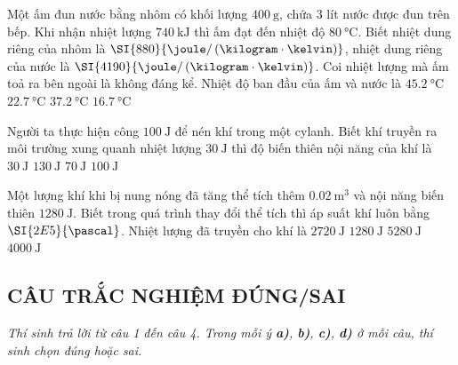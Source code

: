 \begin{ex}
	Một ấm đun nước bằng nhôm có khối lượng $\SI{400}{\gram}$, chứa 3 lít nước được đun trên bếp. Khi nhận nhiệt lượng $\SI{740}{\kilo\joule}$ thì ấm đạt đến nhiệt độ $\SI{80}{\celsius}$. Biết nhiệt dung riêng của nhôm là $\SI{880}{\joule/\left(\kilogram\cdot\kelvin\right)}$, nhiệt dung riêng của nước là $\SI{4190}{\joule/\left(\kilogram\cdot\kelvin\right)}$. Coi nhiệt lượng mà ấm toả ra bên ngoài là không đáng kể. Nhiệt độ ban đầu của ấm và nước là
	\choice
	{$\SI{45.2}{\celsius}$}
	{\True $\SI{22.7}{\celsius}$}
	{$\SI{37.2}{\celsius}$}
	{$\SI{16.7}{\celsius}$}
\end{ex}
\begin{ex}
	Người ta thực hiện công $\SI{100}{\joule}$ để nén khí trong một cylanh. Biết khí truyền ra môi trường xung quanh nhiệt lượng $\SI{30}{\joule}$ thì độ biến thiên nội năng của khí là
	\choice
	{$\SI{30}{\joule}$}
	{$\SI{130}{\joule}$}
	{\True $\SI{70}{\joule}$}
	{$\SI{100}{\joule}$}
\end{ex}
\begin{ex}
	Một lượng khí khi bị nung nóng đã tăng thể tích thêm $\SI{0.02}{\meter^3}$ và nội năng biến thiên $\SI{1280}{\joule}$. Biết trong quá trình thay đổi thể tích thì áp suất khí luôn bằng $\SI{2E5}{\pascal}$. Nhiệt lượng đã truyền cho khí là
	\choice
	{$\SI{2720}{\joule}$}
	{$\SI{1280}{\joule}$}
	{\True $\SI{5280}{\joule}$}
	{$\SI{4000}{\joule}$}
\end{ex}

\subsection{CÂU TRẮC NGHIỆM ĐÚNG/SAI}
\setcounter{ex}{0}
\textit{Thí sinh trả lời từ câu 1 đến câu 4. Trong mỗi ý \textbf{a)}, \textbf{b)}, \textbf{c)}, \textbf{d)} ở mỗi câu, thí sinh chọn đúng hoặc sai.}

